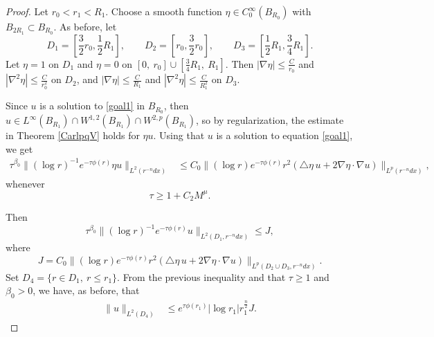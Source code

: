 \documentclass[11pt]{amsart}
\theoremstyle{plain}
\numberwithin{equation}{section}
\begin{document}
\begin{proof}
Let $r_0< r_1< R_1$.
Choose a smooth function $\eta\in C^\infty_{0}(B_{R_0})$ with $B_{2R_1}\subset B_{R_0}$.
As before, let
$$D_1={\left[{\frac{3}{2}r_0, \frac{1}{2}R_1 }\right]}, \quad  \quad
D_2= {\left[{r_0, \frac{3}{2}r_0}\right]}, \quad \quad
D_3={\left[{\frac{1}{2}R_1, \frac{3 }{4}R_1}\right]}.$$
Let $\eta=1$ on $D_1$ and $\eta=0$ on $[0, \ r_0]\cup {\left[{\frac{3}{4}R_1, \ R_1}\right]}$.
Then $|\nabla \eta|\leq \frac{C}{r_0}$ and $|\nabla^2\eta|\leq \frac{C}{r_0^2}$ on $D_2$, and $|\nabla \eta|\leq \frac{C}{R_1}$ and $|\nabla^2 \eta|\leq\frac{C}{R_1^2}$ on $D_3$.

Since $u$ is a solution to \eqref{goal1} in $B_{R_0}$, then $u \in L^{\infty}{\left( {B_{R_1}} \right) } \cap W^{1,2}{\left( {B_{R_1}} \right) } \cap W^{2,p}{\left( {B_{R_1}} \right) }$, so by regularization, the estimate in Theorem \ref{CarlpqV} holds for $\eta u$.
Using that $u$ is a solution to equation \eqref{goal1}, we get
\begin{align*}
\tau^{{\beta}_0} \|(\log r)^{-1} e^{-\tau \phi(r)} \eta u\|_{L^2(r^{-n}dx)}
&\leq  C_0 \|(\log r ) e^{-\tau \phi(r)} r^2{\left( { \triangle \eta \, u + 2 {\nabla} \eta \cdot {\nabla} u  } \right) }\|_{L^p(r^{-n} dx)},
\end{align*}
whenever
$$\tau \ge 1+ C_2 M^{\mu}.$$

Then
\begin{equation*}
\tau^{\beta_0} \|(\log r)^{-1} e^{-\tau \phi(r)} u\|_{L^2(D_1, r^{-n}dx )}\leq J,
\end{equation*}
where
$$ J= C_0 \|(\log r) e^{-\tau \phi(r)} r^2 (\triangle \eta \, u + 2\nabla \eta \cdot \nabla u)\|_{L^p(D_2\cup D_3, r^{-n} dx)}.$$
Set $D_4=\{r\in D_1, \ r\leq r_1\}$.
From the previous inequality and that $\tau \ge 1$ and ${\beta}_0 > 0$, we have, as before, that
\begin{align}
\| u\|_{L^2 (D_4)}
&\le e^{\tau \phi(r_1)} |\log r_1| r_1^{\frac{n}{2}} J.
\label{JBound}
\end{align}


\end{proof}
\end{document}
